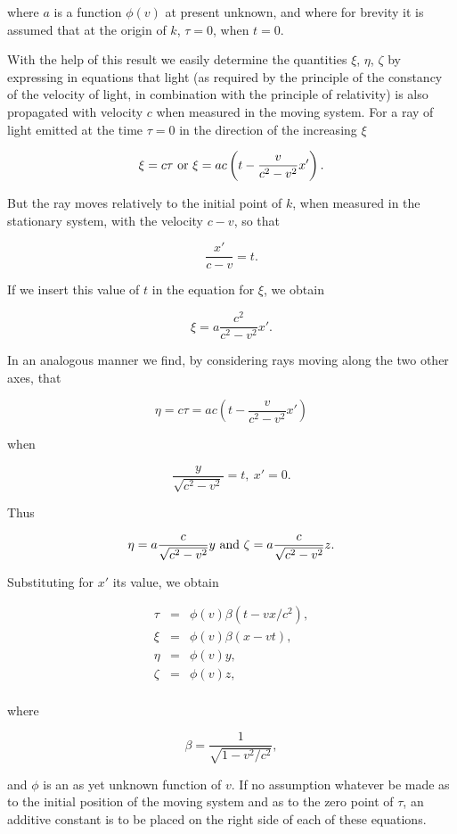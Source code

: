 \documentclass{article}
\begin{document}
\noindent
where $a$ is a function $\phi(v)$ at present unknown, and where for brevity
it is assumed that at the origin of $k$, $\tau =0$, when $t=0$.

With the help of this result we easily determine the quantities
$\xi$, $\eta$, $\zeta$
by expressing in equations that light (as required by the principle
of the constancy of the velocity of light, in combination with the
principle of relativity) is also propagated with velocity $c$ when
measured in the moving system.  For a ray of light emitted at the time
$\tau=0$ in the direction of the increasing $\xi$
 
\[
\xi=c\tau\ {\rm or}\ \xi=ac\left(t-\frac{v}{c^2-v^2}x'\right).
\]

\noindent
But the ray moves relatively to the initial point of $k$, when measured
in the stationary system, with the velocity $c-v$, so that

\[
\frac{x'}{c-v}=t.
\]

\noindent
If we insert this value of $t$ in the equation for $\xi$, we obtain

\[
\xi=a\frac{c^2}{c^2-v^2}x'.
\]

\noindent
In an analogous manner we find, by considering rays moving along the
two other axes, that

\[
\eta=c\tau=ac\left(t-\frac{v}{c^2-v^2}x'\right)
\]

\noindent
when
  
\[
\frac{y}{\sqrt{c^2-v^2}}=t,\ x'=0.
\]

\noindent
Thus

\[
\eta=a\frac{c}{\sqrt{c^2-v^2}}y\ {\rm and}\ \zeta=a\frac{c}{\sqrt{c^2-v^2}}z.
\]

Substituting for $x'$ its value, we obtain

\begin{eqnarray*}
\tau    & = &   \phi(v)\beta(t-vx/c^2),  \\
\xi     & = &   \phi(v)\beta(x-vt),      \\
\eta    & = &   \phi(v)y,                \\
\zeta   & = &   \phi(v)z,                \\
\end{eqnarray*}

\noindent
where

\[
\beta = \frac{1}{\sqrt{1-v^2/c^2}},
\]

\noindent
and $\phi$ is an as yet unknown function of $v$.  If no assumption whatever
be made as to the initial position of the moving system and as to the
zero point of $\tau$, an additive constant is to be placed on the right
side of each of these equations.
\end{document}
